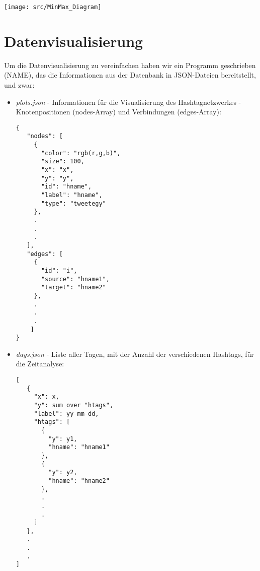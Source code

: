 \documentclass[paper=a4, english, ngerman, romanian]{scrartcl}
\begin{document}
		\begin{center}
			\texttt{[image: src/MinMax\_Diagram]}
		\end{center}
		
		\pagebreak

	\section{Datenvisualisierung}
	
		Um die Datenvisualisierung zu vereinfachen haben wir ein Programm geschrieben (NAME), das die Informationen aus der Datenbank in JSON-Dateien bereitstellt, und zwar:
			\begin{itemize}
				\item	\textit{plots.json} - Informationen für die Visualisierung des Hashtagnetzwerkes - Knotenpositionen (nodes-Array) und Verbindungen (edges-Array):
				\begin{lstlisting}
{
   "nodes": [
     {
       "color": "rgb(r,g,b)",
       "size": 100,
       "x": "x",
       "y": "y",
       "id": "hname",
       "label": "hname",
       "type": "tweetegy"
     },
     .
     .
     .
   ],
   "edges": [
     {
       "id": "i",
       "source": "hname1",
       "target": "hname2"
     },
     .
     .
     .
    ]
}
				\end{lstlisting}
				
				\item \textit{days.json} - Liste aller Tagen, mit der Anzahl der verschiedenen Hashtags, für die Zeitanalyse:
				
				\begin{lstlisting}
[
   {
     "x": x,
     "y": sum over "htags",
     "label": yy-mm-dd,
     "htags": [
       {
         "y": y1,
         "hname": "hname1"
       },
       {
         "y": y2,
         "hname": "hname2"
       },
       .
       .
       .
     ]
   },
   .
   .
   .
]
				\end{lstlisting}
			\end{itemize}
	
\end{document}
